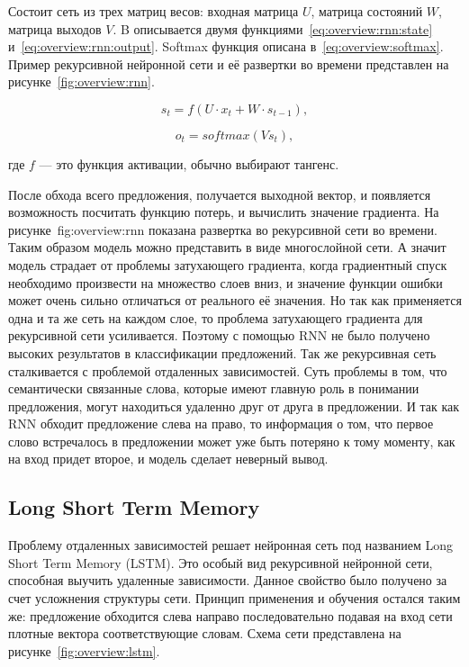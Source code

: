 Состоит сеть из трех матриц весов: входная матрица $U$, матрица состояний $W$, матрица выходов $V$. B описывается двумя функциями~\ref{eq:overview:rnn:state} и~\ref{eq:overview:rnn:output}. Softmax функция описана в~\ref{eq:overview:softmax}. Пример рекурсивной нейронной сети и её развертки во времени представлен на рисунке~\ref{fig:overview:rnn}.

\begin{equation}
  \label{eq:overview:rnn:state}
  s_t = f(U\cdot{x_t} + W\cdot{s_{t-1}}),
\end{equation}

\begin{equation}
  \label{eq:overview:rnn:output}
  o_t = softmax(Vs_t),
\end{equation}
\begin{explanationx}
\item [где] $f$ --- это функция активации, обычно выбирают тангенс.
\end{explanationx}

После обхода всего предложения, получается выходной вектор, и появляется возможность посчитать функцию потерь, и вычислить значение градиента. На рисунке~{fig:overview:rnn} показана развертка во рекурсивной сети во времени. Таким образом модель можно представить в виде многослойной сети. А значит модель страдает от проблемы затухающего градиента, когда градиентный спуск необходимо произвести на множество слоев вниз, и значение функции ошибки может очень сильно отличаться от реального её значения. Но так как применяется одна и та же сеть на каждом слое, то проблема затухающего градиента для рекурсивной сети усиливается. Поэтому с помощью RNN не было получено высоких результатов в классификации предложений. Так же рекурсивная сеть сталкивается с проблемой отдаленных зависимостей. Суть проблемы в том, что семантически связанные слова, которые имеют главную роль в понимании предложения, могут находиться удаленно друг от друга в предложении. И так как RNN обходит предложение слева на право, то информация о том, что первое слово встречалось в предложении может уже быть потеряно к тому моменту, как на вход придет второе, и модель сделает неверный вывод.

\subsection{Long Short Term Memory}\label{sec:overview:lstm}
Проблему отдаленных зависимостей решает нейронная сеть под названием Long Short Term Memory (LSTM). Это особый вид рекурсивной нейронной сети, способная выучить удаленные зависимости. Данное свойство было получено за счет усложнения структуры сети. Принцип применения и обучения остался таким же: предложение обходится слева направо последовательно подавая на вход сети плотные вектора соответствующие словам. Схема сети представлена на рисунке~\ref{fig:overview:lstm}.

